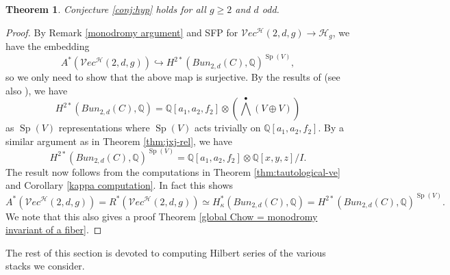 \documentclass[11pt]{amsart}
\newtheorem{theorem}{Theorem}[section]
\theoremstyle{definition}
\begin{document}
\begin{theorem}\label{thm:conj-odd}
    Conjecture \ref{conj:hyp} holds for all $g\geq 2$ and $d$ odd.
\end{theorem}
\begin{proof}
    By Remark \ref{monodromy argument} and SFP for $\mathcal Vec^\mathcal H(2,d,g) \rightarrow \mathcal H_g$, we have the embedding \begin{equation*}
        A^*(\mathcal Vec^\mathcal H(2,d,g)) \hookrightarrow H^{2*} (Bun_{2,d}(C),\mathbb Q)^{\operatorname{Sp}(V)},
    \end{equation*}so we only need to show that the above map is surjective. By the results of \cite{atiyah-bott} (see also \cite[Theorem 4.7]{MR3013029}), we have \begin{equation*}
        H^{2*}(Bun_{2,d}(C),\mathbb Q) =\mathbb Q[a_1,a_2,f_2] \otimes \left ( \bigwedge^\bullet (V\oplus V) \right ) 
    \end{equation*}    as $\operatorname{Sp}(V)$ representations where $\operatorname{Sp}(V)$ acts trivially on $\mathbb Q[a_1,a_2, f_2]$. By a similar argument as in Theorem \ref{thm:jxj-rel}, we have \begin{equation*}
        H^{2*} (Bun_{2,d}(C),\mathbb Q)^{\operatorname{Sp}(V)} = \mathbb Q[a_1,a_2,f_2] \otimes \mathbb Q[x,y,z]/I.
    \end{equation*} The result now follows from the computations in Theorem \ref{thm:tautological-ve} and Corollary \ref{kappa computation}. In fact this shows \begin{equation*}
        A^*(\mathcal Vec^\mathcal H(2,d,g)) =R^* (\mathcal Vec^\mathcal H(2,d,g)) \simeq H^{*}_\kappa (Bun_{2,d}(C),\mathbb Q) =H^{2*}(Bun_{2,d}(C),\mathbb Q)^{\operatorname{Sp}(V)}.
    \end{equation*}We note that this also gives a proof Theorem \ref{global Chow = monodromy invariant of a fiber}.
\end{proof}

\noindent The rest of this section is devoted to computing Hilbert series of the various stacks we consider.
\end{document}
